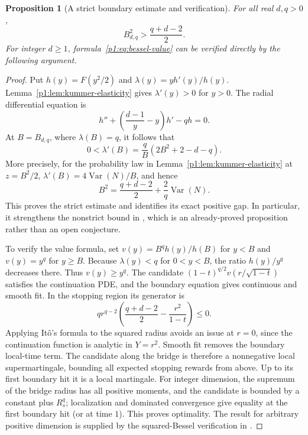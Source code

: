 \documentclass[11pt,a4paper]{article}
\newtheorem{proposition}[theorem]{Proposition}
\theoremstyle{definition}
\theoremstyle{remark}
\numberwithin{equation}{section}
\begin{document}
\begin{proposition}[A strict boundary estimate and verification]
\label{p1:prop:bessel-boundary-strict}
For all real $d,q>0$,
\[
 B_{d,q}^2>\frac{q+d-2}{2}.
\]
For integer $d\ge1$, formula~\eqref{p1:eq:bessel-value} can be verified
directly by the following argument.
\end{proposition}
\begin{proof}
Put $h(y)=F(y^2/2)$ and $\lambda(y)=yh'(y)/h(y)$.
Lemma~\ref{p1:lem:kummer-elasticity} gives $\lambda'(y)>0$ for $y>0$.
The radial differential equation is
\[
 h''+\left(\frac{d-1}{y}-y\right)h'-qh=0.
\]
At $B=B_{d,q}$, where $\lambda(B)=q$, it follows that
\[
 0<\lambda'(B)=\frac qB(2B^2+2-d-q).
\]
More precisely, for the probability law in
Lemma~\ref{p1:lem:kummer-elasticity} at $z=B^2/2$,
$\lambda'(B)=4\operatorname{Var}(N)/B$, and hence
\[
 B^2=\frac{q+d-2}{2}+\frac{2}{q}\operatorname{Var}(N).
\]
This proves the strict estimate and identifies its exact positive gap.
In particular, it strengthens the
nonstrict bound in \cite[Proposition~3.1]{p1:HobsonLiu2026}, which is an
already-proved proposition rather than an open conjecture.

To verify the value formula, set $v(y)=B^qh(y)/h(B)$ for $y<B$ and
$v(y)=y^q$ for $y\ge B$. Because $\lambda(y)<q$ for $0<y<B$, the
ratio $h(y)/y^q$ decreases there. Thus $v(y)\ge y^q$.
The candidate $(1-t)^{q/2}v(r/\sqrt{1-t})$ satisfies the continuation
PDE, and the boundary equation gives continuous and smooth fit.
In the stopping region its generator is
\[
 q r^{q-2}\left(\frac{q+d-2}{2}-\frac{r^2}{1-t}\right)\le0.
\]
Applying It\^o's formula to the squared radius avoids an issue at
$r=0$, since the continuation function is analytic in $Y=r^2$.
Smooth fit removes the boundary local-time term. The candidate along
the bridge is therefore a nonnegative local supermartingale, bounding
all expected stopping rewards from above. Up to its first boundary
hit it is a local martingale. For integer dimension, the supremum of
the bridge radius has all positive moments, and the candidate is
bounded by a constant plus $R_s^q$; localization and dominated
convergence give equality at the first boundary hit (or at time $1$).
This proves optimality. The result for arbitrary positive dimension
is supplied by the squared-Bessel verification in
\cite[Theorem~3.1]{p1:HobsonLiu2026}.
\end{proof}
\end{document}
